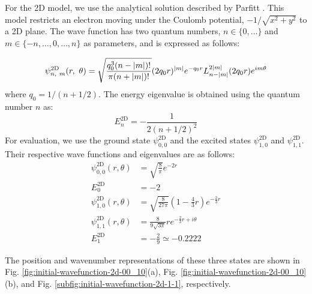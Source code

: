 \documentclass[jctc-draft.tex]{subfiles}
\begin{document}
For the 2D model, we use the analytical solution described by Parfitt
\cite{Parfitt2002.10.1063/1.1503868}. This model restricts an electron moving
under the Coulomb potential, $-1/\sqrt{x^2+y^2}$ to a 2D plane. The wave function
has two quantum numbers, $n\in\{0,\ldots\}$ and $m\in\{-n,\ldots,0,\ldots,n\}$ as
parameters, and is expressed as follows:

\begin{equation}
\psi_{n,\ m}^{\mathrm{2D}}(r,\ \theta)=
\sqrt{\frac{q_0^3(n-{\left| m \right|})!}{\pi(n+{\left| m \right|})!}}(2q_0r)^{{\left| m \right|}}
e^{-q_0r}L_{n-{\left| m \right|}}^{2{\left| m \right|}}(2q_0r)e^{im\theta}
\end{equation}
where $q_0=1/(n+1/2)$. The energy eigenvalue is obtained using the quantum number $n$ as:
\begin{equation}
E_n^{\mathrm{2D}}=-\frac{1}{2(n+1/2)^2}
\end{equation}
For evaluation, we use the ground state $\psi_{0,0}^{\mathrm{2D}}$ and the excited states $\psi_{1,0}^{\mathrm{2D}}$ and $\psi_{1,1}^{\mathrm{2D}}$. Their respective wave functions and eigenvalues are as follows:
\begin{align}
\psi_{0,0}^{\mathrm{2D}}(r,\theta)&=\sqrt{\frac{8}{\pi}}e^{-2r}
\label{eq:psi2D00-wave-function}\\
E_0^{\mathrm{2D}}&=-2
\label{eq:psi2D00-energy}\\
\psi_{1,0}^{\mathrm{2D}}(r,\theta)&=\sqrt{\frac{8}{27\pi}}(1-\frac{4}{3}r)e^{-\frac{2}{3}r} 
\label{eq:psi2D10-wave-function}\\
\psi_{1,1}^{\mathrm{2D}}(r,\theta)&=\frac{8}{9\sqrt{3\pi}}re^{-\frac{2}{3}r+i\theta}
\label{eq:psi2D11-wave-function}\\
E_1^{\mathrm{2D}}&=-\frac{2}{9}\simeq -0.2222
\label{eq:psi2D10-energy}
\end{align}

The position and wavenumber representations of these three states are shown in
Fig. \ref{fig:initial-wavefunction-2d-00_10}(a), Fig.
\ref{fig:initial-wavefunction-2d-00_10}(b), and
Fig. \ref{subfig:initial-wavefunction-2d-1-1}, respectively.
\end{document}
